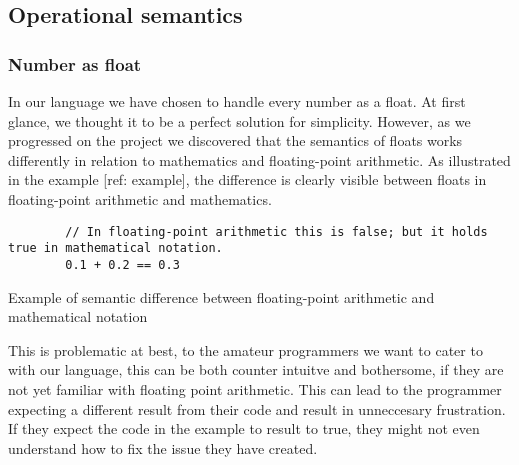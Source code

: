 \subsection{Operational semantics}\label{subsec:operationalSemantics}


\subsubsection{Number as float}\label{subsubsec:numberAsFloats}
In our language we have chosen to handle every number as a float. At first glance, we thought it to be a perfect solution for simplicity. However, as we progressed on the project we discovered that the semantics of floats works differently in relation to mathematics and floating-point arithmetic. As illustrated in the example [ref: example], the difference is clearly visible between floats in floating-point arithmetic and mathematics.


\begin{listing}[htb!]
    \begin{verbatim}
        // In floating-point arithmetic this is false; but it holds true in mathematical notation.
        0.1 + 0.2 == 0.3
    \end{verbatim}
    \caption{Example of semantic difference between floating-point arithmetic and mathematical notation}
    \label{lst:semanticDifference}
\end{listing}


This is problematic at best, to the amateur programmers we want to cater to with our language, this can be both counter intuitve and bothersome, if they are not yet familiar with floating point arithmetic. This can lead to the programmer expecting a different result from their code and result in unneccesary frustration. If they expect the code in the example to result to true, they might not even understand how to fix the issue they have created.




